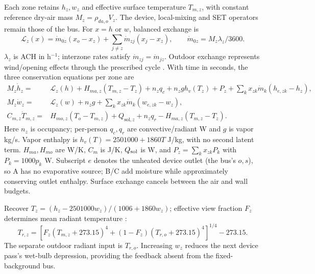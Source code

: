 Each zone retains $h_z,w_z$ and effective surface temperature $T_{m,z}$, with constant reference dry-air mass $M_z=\rho_{da,o}V_z$. The device, local-mixing and SET operators remain those of the bus. For $x=h$ or $w$, balanced exchange is
\begin{equation}
 \mathcal L_z(x)=\dot m_{0z}(x_o-x_z)+\sum_{j\ne z}\dot m_{zj}(x_j-x_z),
 \qquad \dot m_{0z}=M_z\lambda_z/3600.
\label{eq:rail-exchange}
\end{equation}
$\lambda_z$ is ACH in h$^{-1}$; interzone rates satisfy $\dot m_{zj}=\dot m_{jz}$. Outdoor exchange represents wind/opening effects through the prescribed cycle \cite{ventilation}. With time in seconds, the three conservation equations per zone are \cite{epzone}
\begin{align}
 M_z\dot h_z={}&\mathcal L_z(h)+H_{ma,z}(T_{m,z}-T_z)
 +n_zq_c+n_zg h_v(T_z)+P_z
 +\sum_k x_{zk}\dot m_k(h_{e,zk}-h_z),\label{eq:rail-enthalpy}\\
 M_z\dot w_z={}&\mathcal L_z(w)+n_zg+
 \sum_k x_{zk}\dot m_k(w_{e,zk}-w_z),\label{eq:rail-moisture}\\
 C_{m,z}\dot T_{m,z}={}&H_{mo,z}(T_o-T_{m,z})+Q_{\mathrm{sol},z}
 +n_zq_r-H_{ma,z}(T_{m,z}-T_z).\label{eq:rail-surface}
\end{align}
Here $n_z$ is occupancy; per-person $q_c,q_r$ are convective/radiant W and $g$ is vapor kg/s. Vapor enthalpy is $h_v(T)=2501000+1860T$ J/kg, with no second latent term. $H_{ma},H_{mo}$ are W/K, $C_m$ is J/K, $Q_{\rm sol}$ is W, and $P_z=\sum_kx_{zk}P_k$ with $P_k=1000p_k$ W. Subscript $e$ denotes the unheated device outlet (the bus's $o,s$), so A has no evaporative source; B/C add moisture while approximately conserving outlet enthalpy. Surface exchange cancels between the air and wall budgets.

Recover $T_z=(h_z-2501000w_z)/(1006+1860w_z)$; effective view fraction $F_z$ determines mean radiant temperature \cite{thermalcomfort}:
\begin{equation}
 T_{r,z}=\left[F_z(T_{m,z}+273.15)^4+(1-F_z)(T_{r,o}+273.15)^4\right]^{1/4}-273.15.
\label{eq:rail-mrt}
\end{equation}
The separate outdoor radiant input is $T_{r,o}$. Increasing $w_z$ reduces the next device pass's wet-bulb depression, providing the feedback absent from the fixed-background bus.


